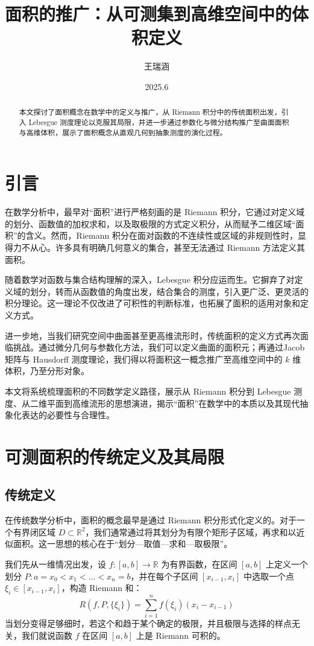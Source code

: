 \documentclass[a4paper, oneside]{article}
\title{\textbf{面积的推广：从可测集到高维空间中的体积定义}}
\author{王瑞涵}
\date{2025.6}
\begin{document}
\maketitle
\begin{abstract}
本文探讨了面积概念在数学中的定义与推广，从 Riemann 积分中的传统面积出发，引入 Lebesgue 测度理论以克服其局限，并进一步通过参数化与微分结构推广至曲面面积与高维体积，展示了面积概念从直观几何到抽象测度的演化过程。
\end{abstract}

\section{引言}
在数学分析中，最早对“面积”进行严格刻画的是 Riemann 积分，它通过对定义域的划分、函数值的加权求和，以及取极限的方式定义积分，从而赋予二维区域“面积”的含义。然而，Riemann 积分在面对函数的不连续性或区域的非规则性时，显得力不从心。许多具有明确几何意义的集合，甚至无法通过 Riemann 方法定义其面积。

随着数学对函数与集合结构理解的深入，Lebesgue 积分应运而生。它摒弃了对定义域的划分，转而从函数值的角度出发，结合集合的测度，引入更广泛、更灵活的积分理论。这一理论不仅改进了可积性的判断标准，也拓展了面积的适用对象和定义方式。

进一步地，当我们研究空间中曲面甚至更高维流形时，传统面积的定义方式再次面临挑战。通过微分几何与参数化方法，我们可以定义曲面的面积元；再通过Jacob矩阵与 Hausdorff 测度理论，我们得以将面积这一概念推广至高维空间中的 $k$ 维体积，乃至分形对象。

本文将系统梳理面积的不同数学定义路径，展示从 Riemann 积分到 Lebesgue 测度、从二维平面到高维流形的思想演进，揭示“面积”在数学中的本质以及其现代抽象化表达的必要性与合理性。

\section{可测面积的传统定义及其局限}
\subsection{传统定义}

在传统数学分析中，面积的概念最早是通过 Riemann 积分形式化定义的。对于一个有界闭区域 $D \subset \mathbb{R}^2$，我们通常通过将其划分为有限个矩形子区域，再求和以近似面积。这一思想的核心在于“划分—取值—求和—取极限”。

我们先从一维情况出发，设 $f:[a,b]\to\mathbb{R}$ 为有界函数，在区间 $[a,b]$ 上定义一个划分 $P: a = x_0 < x_1 < \dots < x_n = b$，并在每个子区间 $[x_{i-1}, x_i]$ 中选取一个点 $\xi_i \in [x_{i-1}, x_i]$，构造 Riemann 和：
\[
R(f,P,\{\xi_i\}) = \sum_{i=1}^{n} f(\xi_i)(x_i - x_{i-1})
\]
当划分变得足够细时，若这个和趋于某个确定的极限，并且极限与选择的样点无关，我们就说函数 $f$ 在区间 $[a,b]$ 上是 Riemann 可积的。
\end{document}
